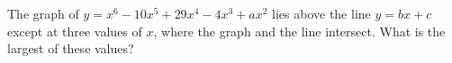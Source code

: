 The graph of $y=x^{6}-10x^{5}+29x^{4}-4x^{3}+ax^{2}$ lies above the line $y=bx+c$ except at three values of $x$, where the graph and the line intersect. What is the largest of these values?
